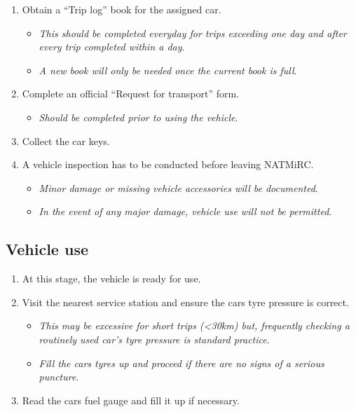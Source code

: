 \documentclass[
  12pt,
]{report}
\providecommand{\tightlist}{%
  \setlength{\itemsep}{0pt}\setlength{\parskip}{0pt}}\usepackage{longtable,booktabs,array}
\begin{document}
\begin{enumerate}
\def\labelenumi{\arabic{enumi}.}
\setcounter{enumi}{2}
\tightlist
\item
  Obtain a ``Trip log'' book for the assigned car.

  \begin{itemize}
  \tightlist
  \item
    \emph{This should be completed everyday for trips exceeding one day
    and after every trip completed within a day}.
  \item
    \emph{A new book will only be needed once the current book is full}.
  \end{itemize}
\item
  Complete an official ``Request for transport'' form.

  \begin{itemize}
  \tightlist
  \item
    \emph{Should be completed prior to using the vehicle}.
  \end{itemize}
\item
  Collect the car keys.
\item
  A vehicle inspection has to be conducted before leaving NATMiRC.

  \begin{itemize}
  \tightlist
  \item
    \emph{Minor damage or missing vehicle accessories will be
    documented}.
  \item
    \emph{In the event of any major damage, vehicle use will not be
    permitted}.
  \end{itemize}
\end{enumerate}

\hypertarget{vehicle-use}{%
\subsection{Vehicle use}\label{vehicle-use}}

\begin{enumerate}
\def\labelenumi{\arabic{enumi}.}
\setcounter{enumi}{6}
\tightlist
\item
  At this stage, the vehicle is ready for use.
\item
  Visit the nearest service station and ensure the cars tyre pressure is
  correct.

  \begin{itemize}
  \tightlist
  \item
    \emph{This may be excessive for short trips (\textless30km) but,
    frequently checking a routinely used car's tyre pressure is standard
    practice}.
  \item
    \emph{Fill the cars tyres up and proceed if there are no signs of a
    serious puncture}.
  \end{itemize}
\item
  Read the cars fuel gauge and fill it up if necessary.
\end{enumerate}
\end{document}
